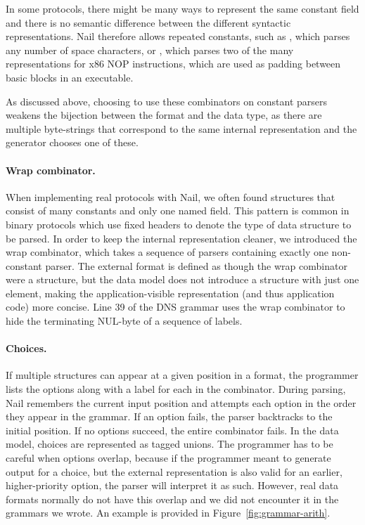 In some protocols, there might be many ways to represent the same constant field
and there is no semantic difference between the different syntactic representations.
Nail therefore allows repeated constants, such as , which parses any number of space characters, or
, which parses two of the many representations for x86
NOP instructions, which are used as padding between basic blocks in an executable. 

As discussed above, choosing to use these combinators on constant parsers
weakens the bijection between the format and the data type, as there are
multiple byte-strings that correspond to the same internal representation and
the generator chooses one of these.

\paragraph{Wrap combinator.} 
When implementing real protocols with Nail, we often found
structures that consist of many constants and only one named field. This pattern is
common in binary protocols which use fixed headers to denote the type of data
structure to be parsed.  In order to keep the internal representation cleaner,
we introduced the wrap combinator, which takes a sequence of parsers containing
exactly one non-constant parser. The external format is defined as though the wrap combinator were a
structure, but the data model does not introduce a structure with just one element, making the application-visible representation
(and thus application code) more concise.
Line 39 of the DNS grammar uses the wrap combinator to hide the terminating NUL-byte of a sequence
of labels.


\paragraph{Choices.}
If multiple structures can appear at a given position in a format, the programmer lists the options
along with a label for each in the  combinator. 
During parsing, Nail remembers the current input position and attempts each option in the order they
appear in the grammar. If an option fails, the parser backtracks to the initial position. If no
options succeed, the entire combinator fails. In the data model, choices are represented as tagged
unions.  The programmer has to be careful when options overlap, because if the programmer meant to
generate output for a choice, but the external representation is also valid for an earlier,
higher-priority option, the parser will interpret it as such. However, real data formats normally do
not have this overlap and we did not encounter it in the grammars we wrote.
An example is provided in Figure~\ref{fig:grammar-arith}.

